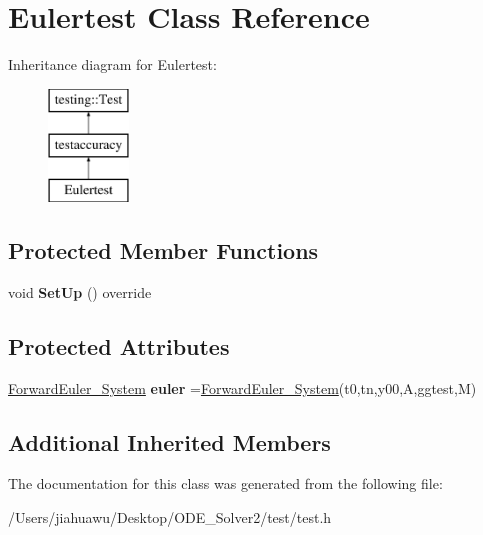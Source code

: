 \hypertarget{class_eulertest}{}\section{Eulertest Class Reference}
\label{class_eulertest}
Inheritance diagram for Eulertest\+:\begin{figure}[H]
\begin{center}
\leavevmode
\includegraphics[height=3.000000cm]{class_eulertest}
\end{center}
\end{figure}
\subsection*{Protected Member Functions}
\begin{DoxyCompactItemize}
\item 
\mbox{\label{class_eulertest_a99abff98e4ff32cfb21240652b974b6b}} 
void {\bfseries Set\+Up} () override
\end{DoxyCompactItemize}
\subsection*{Protected Attributes}
\begin{DoxyCompactItemize}
\item 
\mbox{\label{class_eulertest_ac70f0da356cad71ce285ee978525e0c4}} 
\mbox{\hyperlink{class_forward_euler___system}{Forward\+Euler\+\_\+\+System}} {\bfseries euler} =\mbox{\hyperlink{class_forward_euler___system}{Forward\+Euler\+\_\+\+System}}(t0,tn,y00,A,ggtest,M)
\end{DoxyCompactItemize}
\subsection*{Additional Inherited Members}


The documentation for this class was generated from the following file\+:\begin{DoxyCompactItemize}
\item 
/\+Users/jiahuawu/\+Desktop/\+O\+D\+E\+\_\+\+Solver2/test/test.\+h\end{DoxyCompactItemize}
